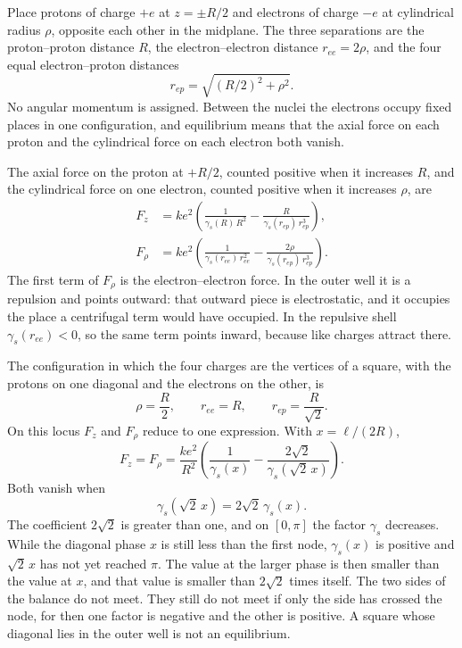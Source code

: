 \documentclass[a4paper]{article}
\begin{document}
Place protons of charge \(+e\) at \(z=\pm R/2\) and electrons of charge \(-e\) at cylindrical radius \(\rho\), opposite each other in the midplane. The three separations are the proton--proton distance \(R\), the electron--electron distance \(r_{ee}=2\rho\), and the four equal electron--proton distances
\[
r_{ep}=\sqrt{(R/2)^{2}+\rho^{2}}.
\]
No angular momentum is assigned. Between the nuclei the electrons occupy fixed places in one configuration, and equilibrium means that the axial force on each proton and the cylindrical force on each electron both vanish.

The axial force on the proton at \(+R/2\), counted positive when it increases \(R\), and the cylindrical force on one electron, counted positive when it increases \(\rho\), are
\begin{align}
F_z
  &=k e^{2}\left(
    \frac{1}{\gamma_s(R)\,R^{2}}
    -\frac{R}{\gamma_s(r_{ep})\,r_{ep}^{3}}
  \right),
\label{eq:Faxial}\\
F_{\rho}
  &=k e^{2}\left(
    \frac{1}{\gamma_s(r_{ee})\,r_{ee}^{2}}
    -\frac{2\rho}{\gamma_s(r_{ep})\,r_{ep}^{3}}
  \right).
\label{eq:Frho}
\end{align}
The first term of \(F_{\rho}\) is the electron--electron force. In the outer well it is a repulsion and points outward: that outward piece is electrostatic, and it occupies the place a centrifugal term would have occupied. In the repulsive shell \(\gamma_s(r_{ee})<0\), so the same term points inward, because like charges attract there.

The configuration in which the four charges are the vertices of a square, with the protons on one diagonal and the electrons on the other, is
\begin{equation}
\label{eq:square}
\rho=\frac{R}{2},
\qquad
r_{ee}=R,
\qquad
r_{ep}=\frac{R}{\sqrt{2}}.
\end{equation}
On this locus \(F_z\) and \(F_{\rho}\) reduce to one expression. With \(x=\ell/(2R)\),
\begin{equation}
\label{eq:squareF}
F_z=F_{\rho}
  =\frac{k e^{2}}{R^{2}}
  \left(
    \frac{1}{\gamma_s(x)}
    -\frac{2\sqrt{2}}{\gamma_s(\sqrt{2}\,x)}
  \right).
\end{equation}
Both vanish when
\begin{equation}
\label{eq:squarecond}
\gamma_s(\sqrt{2}\,x)=2\sqrt{2}\,\gamma_s(x).
\end{equation}
The coefficient \(2\sqrt{2}\) is greater than one, and on \([0,\pi]\) the factor \(\gamma_s\) decreases. While the diagonal phase \(x\) is still less than the first node, \(\gamma_s(x)\) is positive and \(\sqrt{2}\,x\) has not yet reached \(\pi\). The value at the larger phase is then smaller than the value at \(x\), and that value is smaller than \(2\sqrt{2}\) times itself. The two sides of the balance do not meet. They still do not meet if only the side has crossed the node, for then one factor is negative and the other is positive. A square whose diagonal lies in the outer well is not an equilibrium.
\end{document}

